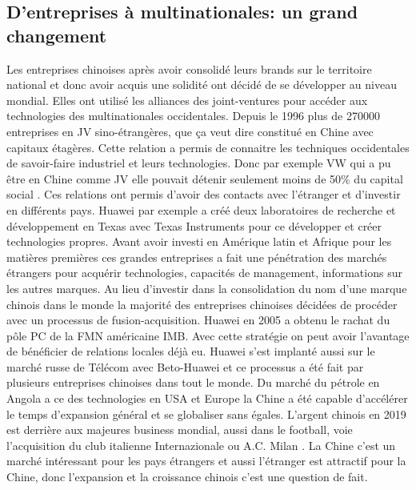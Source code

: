 \subsection{D'entreprises à multinationales: un grand changement}
Les entreprises chinoises après avoir consolidé leurs brands sur le territoire national et donc avoir acquis une solidité ont décidé de se développer au niveau mondial.
 Elles ont utilisé les alliances des joint-ventures pour accéder aux technologies des multinationales occidentales. Depuis le 1996 plus de 270000 entreprises en JV sino-étrangères, que ça veut dire constitué en Chine avec capitaux étagères. Cette relation a permis de connaitre les techniques occidentales de savoir-faire industriel et leurs technologies. Donc par exemple VW qui a pu être en Chine comme JV elle pouvait détenir seulement moins de 50\% du capital social .
Ces relations ont permis d’avoir des contacts avec l’étranger et d’investir en différents pays. Huawei par exemple a créé deux laboratoires de recherche et développement en Texas avec Texas Instruments pour ce développer et créer technologies propres.
Avant avoir investi en Amérique latin et Afrique pour les matières premières ces grandes entreprises a fait une pénétration des marchés étrangers pour acquérir technologies, capacités de management, informations sur les autres marques.  
Au lieu d’investir dans la consolidation du nom d’une marque chinois dans le monde la majorité des entreprises chinoises décidées de procéder avec un processus de fusion-acquisition. Huawei en 2005 a obtenu le rachat du pôle PC de la FMN américaine IMB. Avec cette stratégie on peut avoir l’avantage de bénéficier de relations locales déjà eu. Huawei s’est implanté aussi sur le marché russe de Télécom avec Beto-Huawei et ce processus a été fait par plusieurs entreprises chinoises dans tout le monde. 
Du marché du pétrole en Angola a ce des technologies en USA et Europe la Chine a été capable d’accélérer le temps d’expansion général et se globaliser sans égales. L’argent chinois en 2019 est derrière aux majeures business mondial, aussi dans le football, voie l’acquisition du club italienne Internazionale  ou A.C. Milan . La Chine c’est un marché intéressant pour les pays étrangers et aussi l’étranger est attractif pour la Chine, donc l’expansion et la croissance chinois c’est une question de fait.

